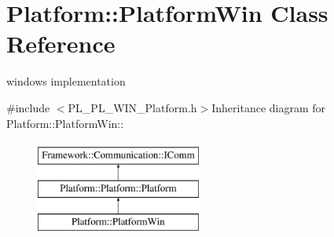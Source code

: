 \hypertarget{classPlatform_1_1PlatformWin}{
\section{Platform::PlatformWin Class Reference}
\label{classPlatform_1_1PlatformWin}
}


windows implementation  


{\ttfamily \#include $<$PL\_\-PL\_\-WIN\_\-Platform.h$>$}Inheritance diagram for Platform::PlatformWin::\begin{figure}[H]
\begin{center}
\leavevmode
\includegraphics[height=3cm]{classPlatform_1_1PlatformWin}
\end{center}
\end{figure}
